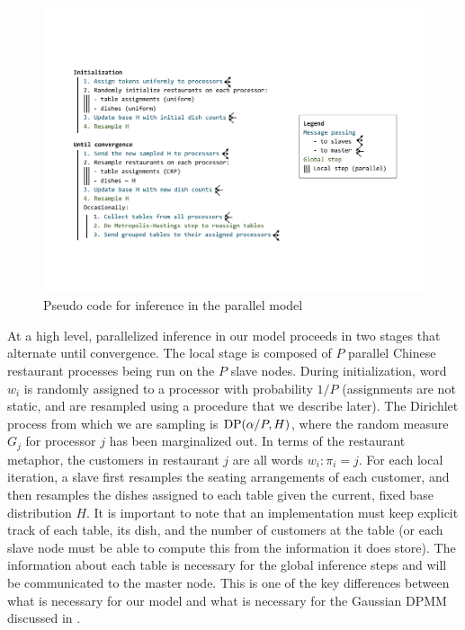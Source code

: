 \begin{figure}[h]
  \centering
  \includegraphics[width=1.05\textwidth]{fig/parallel_code_schema}
  \caption{Pseudo code for inference in the parallel model}
  \label{fig:inference}
\end{figure}

At a high level, parallelized inference in our model proceeds in two
stages that alternate until convergence. The local stage is composed
of $P$ parallel Chinese restaurant processes being run on the $P$
slave nodes. During initialization, word $w_i$ is randomly assigned to
a processor with probability $1/P$ (assignments are not static, and
are resampled using a procedure that we describe later). The Dirichlet
process from which we are sampling is $\mathrm{DP}(\alpha/P, H)$, where the
random measure $G_j$ for processor $j$ has been marginalized out. In
terms of the restaurant metaphor, the customers in restaurant $j$ are
all words $w_i : {\pi_i = j}$. For each local iteration, a slave first
resamples the seating arrangements of each customer, and then
resamples the dishes assigned to each table given the current, fixed
base distribution $H$. It is important to note that an implementation
must keep explicit track of each table, its dish, and the number of
customers at the table (or each slave node must be able to compute
this from the information it does store). The information about each
table is necessary for the global inference steps and will be
communicated to the master node. This is one of the key differences
between what is necessary for our model and what is necessary for the
Gaussian DPMM discussed in \cite{williamson2013}.

